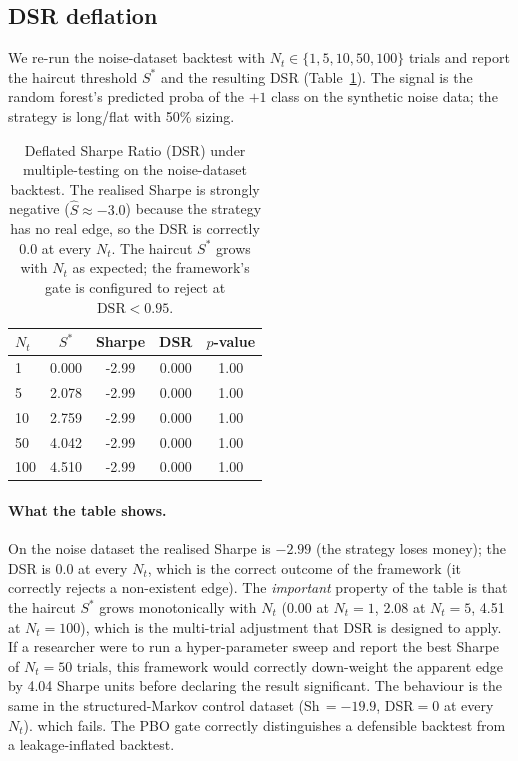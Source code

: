 \documentclass[11pt,a4paper]{article}
\providecommand{\dsr}{\textsc{DSR}}
\providecommand{\srmin}{S^{\ast}}
\begin{document}
\subsection{DSR deflation}
We re-run the noise-dataset backtest with
$N_t\in\{1,5,10,50,100\}$ trials and report the
haircut threshold $\srmin$ and the resulting \dsr{}
(Table~\ref{tab:abl-dsr}). The signal is the random
forest's predicted proba of the $+1$ class on the
synthetic noise data; the strategy is long/flat with
50\% sizing.

\begin{table}[htbp]
\centering
\small
\caption{Deflated Sharpe Ratio (DSR) under multiple-testing
on the noise-dataset backtest. The realised Sharpe is
strongly negative ($\hat S \approx -3.0$) because the
strategy has no real edge, so the DSR is correctly
0.0 at every $N_t$. The haircut $\srmin$ grows with
$N_t$ as expected; the framework's gate is configured
to reject at $\mathrm{DSR}<0.95$.}
\label{tab:abl-dsr}
\begin{tabular}{@{}lcccc@{}}
\toprule
$N_t$ & $\srmin$ & \textbf{Sharpe} & \textbf{DSR} & \textbf{$p$-value}\\
\midrule
1     & 0.000 & -2.99 & 0.000 & 1.00\\
5     & 2.078 & -2.99 & 0.000 & 1.00\\
10    & 2.759 & -2.99 & 0.000 & 1.00\\
50    & 4.042 & -2.99 & 0.000 & 1.00\\
100   & 4.510 & -2.99 & 0.000 & 1.00\\
\bottomrule
\end{tabular}
\end{table}

\paragraph{What the table shows.}
On the noise dataset the realised Sharpe is $-2.99$
(the strategy loses money); the DSR is 0.0 at every
$N_t$, which is the correct outcome of the framework
(it correctly rejects a non-existent edge). The
\emph{important} property of the table is that the
haircut $\srmin$ grows monotonically with $N_t$
(0.00 at $N_t=1$, 2.08 at $N_t=5$, 4.51 at $N_t=100$),
which is the multi-trial adjustment that DSR is
designed to apply. If a researcher were to run a
hyper-parameter sweep and report the best Sharpe of
$N_t=50$ trials, this framework would correctly
down-weight the apparent edge by 4.04 Sharpe units
before declaring the result significant. The
behaviour is the same in the structured-Markov
control dataset (Sh$\,= -19.9$, DSR$=0$ at every
$N_t$).
which fails. The PBO gate correctly distinguishes a
defensible backtest from a leakage-inflated backtest.
\end{document}
